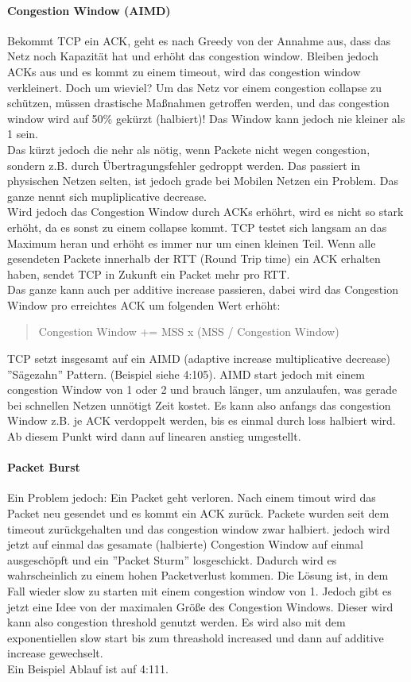 			\paragraph{Congestion Window (AIMD)}
				Bekommt TCP ein ACK, geht es nach Greedy von der Annahme aus, dass das Netz noch Kapazität hat und erhöht das congestion window. Bleiben jedoch ACKs aus und es kommt zu einem timeout, wird das congestion window verkleinert. Doch um wieviel? Um das Netz vor einem congestion collapse zu schützen, müssen drastische Maßnahmen getroffen werden, und das congestion window wird auf 50\% gekürzt (halbiert)! Das Window kann jedoch nie kleiner als 1 sein. \\
				Das kürzt jedoch die nehr als nötig, wenn Packete nicht wegen congestion, sondern z.B. durch Übertragungsfehler gedroppt werden. Das passiert in physischen Netzen selten, ist jedoch grade bei Mobilen Netzen ein Problem. Das ganze nennt sich mupliplicative decrease. \\
				Wird jedoch das Congestion Window durch ACKs erhöhrt, wird es nicht so stark erhöht, da es sonst zu einem collapse kommt. TCP testet sich langsam an das Maximum heran und erhöht es immer nur um einen kleinen Teil. Wenn alle gesendeten Packete innerhalb der RTT (Round Trip time) ein ACK erhalten haben, sendet TCP in Zukunft ein Packet mehr pro RTT. \\
				Das ganze kann auch per additive increase passieren, dabei wird das Congestion Window pro erreichtes ACK um folgenden Wert erhöht:
				\begin{quote}
					Congestion Window += MSS x (MSS / Congestion Window)
				\end{quote}
				TCP setzt insgesamt auf ein AIMD (adaptive increase multiplicative decrease) ''Sägezahn'' Pattern. (Beispiel siehe 4:105). AIMD start jedoch mit einem congestion Window von 1 oder 2 und brauch länger, um anzulaufen, was gerade bei schnellen Netzen unnötigt Zeit kostet. Es kann also anfangs das congestion Window z.B. je ACK verdoppelt werden, bis es einmal durch loss halbiert wird. Ab diesem Punkt wird dann auf linearen anstieg umgestellt. 
			\paragraph{Packet Burst}
				Ein Problem jedoch: Ein Packet geht verloren. Nach einem timout wird das Packet neu gesendet und es kommt ein ACK zurück. Packete wurden seit dem timeout zurückgehalten und das congestion window zwar halbiert. jedoch wird jetzt auf einmal das gesamate (halbierte) Congestion Window auf einmal ausgeschöpft und ein ''Packet Sturm'' losgeschickt. Dadurch wird es wahrscheinlich zu einem hohen Packetverlust kommen. Die Lösung ist, in dem Fall wieder slow zu starten mit einem congestion window von 1. Jedoch gibt es jetzt eine Idee von der maximalen Größe des Congestion Windows. Dieser wird kann also congestion threshold genutzt werden. Es wird also mit dem exponentiellen slow start bis zum threashold increased und dann auf additive increase gewechselt. \\
				Ein Beispiel Ablauf ist auf 4:111.
	

